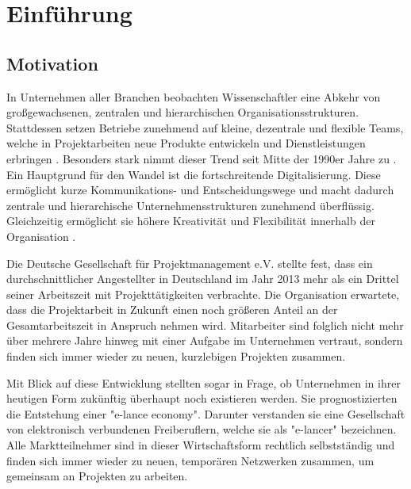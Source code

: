 \chapter{Einführung}
\label{ch:intro}

\section{Motivation}
\label{sec:intro:motivation}
In Unternehmen aller Branchen beobachten Wissenschaftler eine Abkehr von großgewachsenen, zentralen und hierarchischen Organisationsstrukturen. Stattdessen setzen Betriebe zunehmend auf kleine, dezentrale und flexible Teams, welche in Projektarbeiten neue Produkte entwickeln und Dienstleistungen erbringen \cite[S. 3]{elanceEconomy:1999}. Besonders stark nimmt dieser Trend seit Mitte der 1990er Jahre zu \cite[S. 8]{whittington:1999}. Ein Hauptgrund für den Wandel ist die fortschreitende Digitalisierung. Diese ermöglicht kurze Kommunikations- und Entscheidungswege und macht dadurch zentrale und hierarchische Unternehmensstrukturen zunehmend überflüssig. Gleichzeitig ermöglicht sie höhere Kreativität und Flexibilität innerhalb der Organisation \cite[S. 5]{elanceEconomy:1999}.

Die Deutsche Gesellschaft für Projektmanagement e.V. \cite[S. 16]{gpm:2015} stellte fest, dass ein durchschnittlicher Angestellter in Deutschland im Jahr 2013 mehr als ein Drittel seiner Arbeitszeit mit Projekttätigkeiten verbrachte. Die Organisation erwartete, dass die Projektarbeit in Zukunft einen noch größeren Anteil an der Gesamtarbeitszeit in Anspruch nehmen wird. Mitarbeiter sind folglich nicht mehr über mehrere Jahre hinweg mit einer Aufgabe im Unternehmen vertraut, sondern finden sich immer wieder zu neuen, kurzlebigen Projekten zusammen.

Mit Blick auf diese Entwicklung stellten \textcite[S. 2ff.]{elanceEconomy:1999} sogar in Frage, ob Unternehmen in ihrer heutigen Form zukünftig überhaupt noch existieren werden. Sie prognostizierten die Entstehung einer "e-lance economy". Darunter verstanden sie eine Gesellschaft von elektronisch verbundenen Freiberuflern, welche sie als "e-lancer" bezeichnen. Alle Marktteilnehmer sind in dieser Wirtschaftsform rechtlich selbstständig und finden sich immer wieder zu neuen, temporären Netzwerken zusammen, um gemeinsam an Projekten zu arbeiten.


